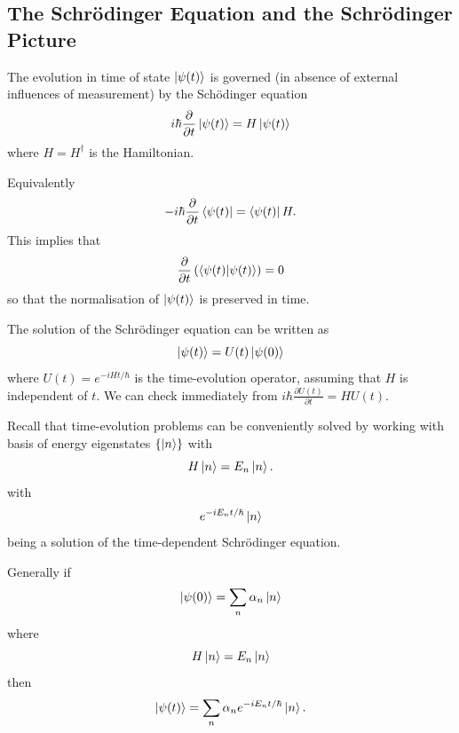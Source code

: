 \documentclass{article}
\begin{document}
\subsection{The Schr\"odinger Equation and the Schr\"odinger Picture}
The evolution in time of state $ \ket {\psi(t)} $ is governed (in absence of external influences of measurement) by the Sch\"odinger equation
\[
	i\hbar \frac{\partial}{\partial t}\ket {\psi(t)} = H\ket{\psi(t)}
\]
where $ H = H^\dagger $ is the Hamiltonian.\par
Equivalently
\[
	-i\hbar \frac\partial{\partial t}\bra{\psi(t)} = \bra{\psi(t)} H.
\]
This implies that
\[
	\frac \partial{\partial t}\left(\bra{\psi(t)}\ket{\psi(t)}\right) = 0
\]
so that the normalisation of $ \ket{\psi(t)} $ is preserved in time.\par
The solution of the Schr\"odinger equation can be written as
\[
	\ket{\psi(t)} = U(t)\ket{\psi(0)}
\]
where $ U(t) = e^{-iHt/\hbar} $ is the time-evolution operator, assuming that $ H $ is independent of $ t $. We can check immediately from $ i\hbar \frac{\partial U(t)}{\partial t} = HU(t) $.\par
Recall that time-evolution problems can be conveniently solved by working with basis of energy eigenstates $ \{\ket n\} $ with
\[
  H\ket n = E_n\ket n.
\]
with
\[
	e^{-iE_n t/\hbar}\ket n
\]
being a solution of the time-dependent Schr\"odinger equation.
\par
Generally if
\[
	\ket{\psi(0)} = \sum_n\alpha_n \ket{n}
\]
where 
\[
  H\ket n = E_n\ket n
\]
then
\[
	\ket {\psi(t)} = \sum_n\alpha_n e^{-iE_nt/\hbar} \ket n.
\]
\end{document}
